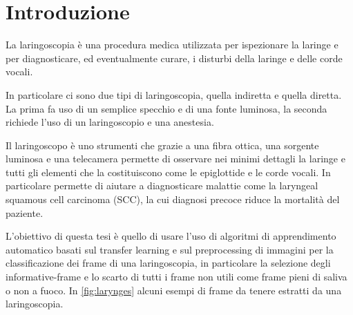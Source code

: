 \chapter{Introduzione}\label{introduzione}

La laringoscopia è una procedura medica utilizzata per ispezionare la laringe e per diagnosticare, ed eventualmente curare, i disturbi della laringe e delle corde vocali.

In particolare ci sono due tipi di laringoscopia, quella indiretta e quella diretta. La prima fa uso di un semplice specchio e di una fonte luminosa, la seconda richiede l'uso di un laringoscopio e una anestesia.

Il laringoscopo è uno strumenti che grazie a una fibra ottica, una sorgente luminosa e una telecamera permette di osservare nei minimi dettagli la laringe e tutti gli elementi che la costituiscono come le epiglottide e le corde vocali\cite{giorgio_cenni_2008}. In particolare permette di aiutare a diagnosticare malattie come la laryngeal squamous cell carcinoma (SCC), la cui diagnosi precoce riduce la mortalità del paziente\cite{moccia_larynge}.

L'obiettivo di questa tesi è quello di usare l'uso di algoritmi di apprendimento automatico basati sul transfer learning e sul  preprocessing di immagini  per la classificazione dei frame di una laringoscopia, in particolare la selezione degli informative-frame e lo scarto di tutti i frame non utili come frame pieni di saliva o non a fuoco. In \cref{fig:larynges} alcuni esempi di frame da tenere estratti da una laringoscopia.

